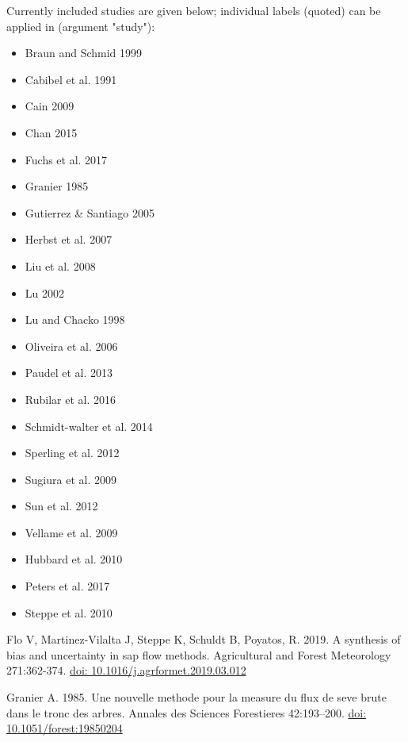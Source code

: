 \documentclass[a4paper]{book}
\begin{document}
%
\begin{Details}\relax
Currently included studies are given below; individual labels (quoted) can be applied in  (argument "study"):

\begin{itemize}

\item{} Braun and Schmid 1999
\item{} Cabibel et al. 1991
\item{} Cain 2009
\item{} Chan 2015
\item{} Fuchs et al. 2017
\item{} Granier 1985
\item{} Gutierrez \& Santiago 2005
\item{} Herbst et al. 2007
\item{} Liu et al. 2008
\item{} Lu 2002
\item{} Lu and Chacko 1998
\item{} Oliveira et al. 2006
\item{} Paudel et al. 2013
\item{} Rubilar et al. 2016
\item{} Schmidt-walter et al. 2014
\item{} Sperling et al. 2012
\item{} Sugiura et al. 2009
\item{} Sun et al. 2012
\item{} Vellame et al. 2009
\item{} Hubbard et al. 2010
\item{} Peters et al. 2017
\item{} Steppe et al. 2010


\end{itemize}

\end{Details}
%
\begin{References}\relax
Flo V, Martinez-Vilalta J, Steppe K, Schuldt B, Poyatos, R. 2019.
A synthesis of bias and uncertainty in sap flow methods.
Agricultural and Forest Meteorology 271:362-374. \url{doi: 10.1016/j.agrformet.2019.03.012}

Granier A. 1985. Une nouvelle methode pour la measure du flux de seve brute dans le tronc des arbres.
Annales des Sciences Forestieres 42:193–200. \url{doi: 10.1051/forest:19850204}
\end{References}
\end{document}
